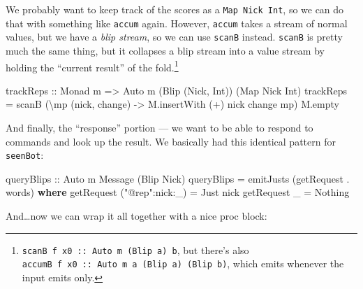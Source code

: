 \documentclass[]{article}
\newenvironment{Shaded}{}{}
\newcommand{\DataTypeTok}[1]{\textcolor[rgb]{0.56,0.13,0.00}{#1}}
\newcommand{\FunctionTok}[1]{\textcolor[rgb]{0.02,0.16,0.49}{#1}}
\newcommand{\KeywordTok}[1]{\textcolor[rgb]{0.00,0.44,0.13}{\textbf{#1}}}
\newcommand{\NormalTok}[1]{#1}
\newcommand{\OtherTok}[1]{\textcolor[rgb]{0.00,0.44,0.13}{#1}}
\newcommand{\StringTok}[1]{\textcolor[rgb]{0.25,0.44,0.63}{#1}}
\begin{document}
We probably want to keep track of the scores as a \texttt{Map\ Nick\ Int}, so we
can do that with something like \texttt{accum} again. However, \texttt{accum}
takes a stream of normal values, but we have a \emph{blip stream}, so we can use
\texttt{scanB} instead. \texttt{scanB} is pretty much the same thing, but it
collapses a blip stream into a value stream by holding the ``current result'' of
the fold.\footnote{\texttt{scanB\ f\ x0\ ::\ Auto\ m\ (Blip\ a)\ b}, but there's
  also \texttt{accumB\ f\ x0\ ::\ Auto\ m\ a\ (Blip\ a)\ (Blip\ b)}, which emits
  whenever the input emits only.}

\begin{Shaded}
\begin{Highlighting}[]
\OtherTok{trackReps ::} \DataTypeTok{Monad}\NormalTok{ m }\OtherTok{=>} \DataTypeTok{Auto}\NormalTok{ m (}\DataTypeTok{Blip}\NormalTok{ (}\DataTypeTok{Nick}\NormalTok{, }\DataTypeTok{Int}\NormalTok{)) (}\DataTypeTok{Map} \DataTypeTok{Nick} \DataTypeTok{Int}\NormalTok{)}
\NormalTok{trackReps }\FunctionTok{=}\NormalTok{ scanB (\textbackslash{}mp (nick, change) }\OtherTok{->}\NormalTok{ M.insertWith (}\FunctionTok{+}\NormalTok{) nick change mp) M.empty}
\end{Highlighting}
\end{Shaded}

And finally, the ``response'' portion --- we want to be able to respond to
commands and look up the result. We basically had this identical pattern for
\texttt{seenBot}:

\begin{Shaded}
\begin{Highlighting}[]
\OtherTok{queryBlips ::} \DataTypeTok{Auto}\NormalTok{ m }\DataTypeTok{Message}\NormalTok{ (}\DataTypeTok{Blip} \DataTypeTok{Nick}\NormalTok{)}
\NormalTok{queryBlips }\FunctionTok{=}\NormalTok{ emitJusts (getRequest }\FunctionTok{.}\NormalTok{ words)}
  \KeywordTok{where}
\NormalTok{    getRequest (}\StringTok{"@rep"}\FunctionTok{:}\NormalTok{nick}\FunctionTok{:}\NormalTok{_) }\FunctionTok{=} \DataTypeTok{Just}\NormalTok{ nick}
\NormalTok{    getRequest _                }\FunctionTok{=} \DataTypeTok{Nothing}
\end{Highlighting}
\end{Shaded}

And\ldots{}now we can wrap it all together with a nice proc block:
\end{document}
